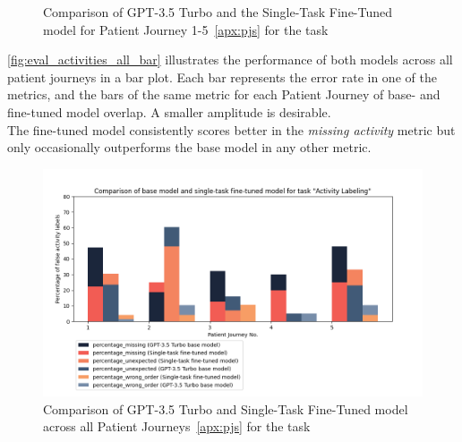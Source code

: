 \begin{figure}[p]
  \caption{Comparison of GPT-3.5 Turbo and the Single-Task Fine-Tuned model for Patient Journey 1-5~\ref{apx:pjs} for the task }
  \label{fig:eval_activities_single_rad}
\end{figure}
\autoref{fig:eval_activities_all_bar} illustrates the performance of both models across all patient journeys in a bar plot. Each bar represents the error rate in one of the metrics, and the bars of the same metric for each Patient Journey of base- and fine-tuned model overlap. A smaller amplitude is desirable. \\
The fine-tuned model consistently scores better in the \emph{missing activity} metric but only occasionally outperforms the base model in any other metric. 
\begin{figure}[hbt]
    \centering
    \captionsetup{belowskip=0pt,aboveskip=0pt}
    \includegraphics[width=\textwidth]{bachelor_thesis/images/activites_all-single.png}
    \caption{Comparison of GPT-3.5 Turbo and  Single-Task Fine-Tuned model across all Patient Journeys~\ref{apx:pjs} for the task } 
    \label{fig:eval_activities_all_bar}
\end{figure}

\newpage
